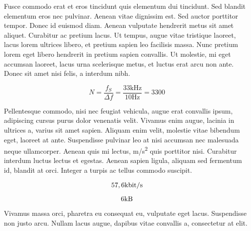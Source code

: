 \documentclass[a4paper,9pt]{scrartcl}
\begin{document}
Fusce commodo erat et eros tincidunt quis elementum dui tincidunt. Sed blandit elementum eros nec pulvinar. Aenean vitae dignissim est. Sed auctor porttitor tempor. Donec id euismod diam. Aenean vulputate hendrerit metus sit amet aliquet. Curabitur ac pretium lacus. Ut tempus, augue vitae tristique laoreet, lacus lorem ultrices libero, et pretium sapien leo facilisis massa. Nunc pretium lorem eget libero hendrerit in pretium sapien convallis. Ut molestie, mi eget accumsan laoreet, lacus urna scelerisque metus, et luctus erat arcu non ante. Donec sit amet nisi felis, a interdum nibh.

\[ N = \frac{f_S}{\Delta f} = \frac{33\si{\kilo\hertz}}{10\si{\hertz}} = 3300\]

Pellentesque commodo, nisi nec feugiat vehicula, augue erat convallis ipsum, adipiscing cursus purus dolor venenatis velit. Vivamus enim augue, lacinia in ultrices a, varius sit amet sapien. Aliquam enim velit, molestie vitae bibendum eget, laoreet at ante. Suspendisse pulvinar leo at nisi accumsan nec malesuada neque ullamcorper. Aenean quis mi lectus, \si{\meter/\second^2} quis porttitor nisi. Curabitur interdum luctus lectus et egestas. Aenean sapien ligula, aliquam sed fermentum id, blandit at orci. Integer a turpis ac tellus commodo suscipit.


\[ 57,6 \si[per-mode=symbol]{\kilo\bit\per\second} \]

\[ 6 \si{\kilo\byte} \]

Vivamus massa orci, pharetra eu consequat eu, vulputate eget lacus. Suspendisse non justo arcu. Nullam lacus augue, dapibus vitae convallis a, consectetur at elit.
\end{document}

